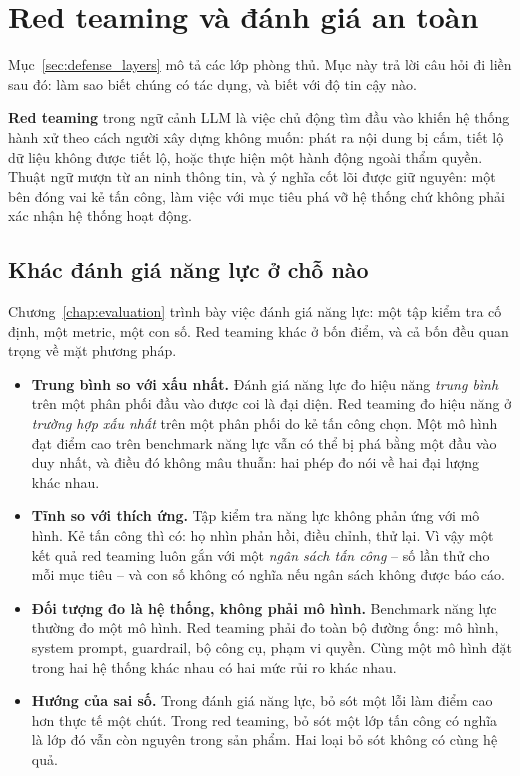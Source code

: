 
\section{Red teaming và đánh giá an toàn}
\label{sec:redteam}

Mục~\ref{sec:defense_layers} mô tả các lớp phòng thủ. Mục này trả lời câu hỏi đi liền sau đó: làm sao biết chúng có tác dụng, và biết với độ tin cậy nào.

\textbf{Red teaming} trong ngữ cảnh LLM là việc chủ động tìm đầu vào khiến hệ thống hành xử theo cách người xây dựng không muốn: phát ra nội dung bị cấm, tiết lộ dữ liệu không được tiết lộ, hoặc thực hiện một hành động ngoài thẩm quyền. Thuật ngữ mượn từ an ninh thông tin, và ý nghĩa cốt lõi được giữ nguyên: một bên đóng vai kẻ tấn công, làm việc với mục tiêu phá vỡ hệ thống chứ không phải xác nhận hệ thống hoạt động.

\subsection{Khác đánh giá năng lực ở chỗ nào}
\label{ssec:redteam_vs_capability}

Chương~\ref{chap:evaluation} trình bày việc đánh giá năng lực: một tập kiểm tra cố định, một metric, một con số. Red teaming khác ở bốn điểm, và cả bốn đều quan trọng về mặt phương pháp.

\begin{itemize}
	\item \textbf{Trung bình so với xấu nhất.} Đánh giá năng lực đo hiệu năng \emph{trung bình} trên một phân phối đầu vào được coi là đại diện. Red teaming đo hiệu năng ở \emph{trường hợp xấu nhất} trên một phân phối do kẻ tấn công chọn. Một mô hình đạt điểm cao trên benchmark năng lực vẫn có thể bị phá bằng một đầu vào duy nhất, và điều đó không mâu thuẫn: hai phép đo nói về hai đại lượng khác nhau.
	\item \textbf{Tĩnh so với thích ứng.} Tập kiểm tra năng lực không phản ứng với mô hình. Kẻ tấn công thì có: họ nhìn phản hồi, điều chỉnh, thử lại. Vì vậy một kết quả red teaming luôn gắn với một \emph{ngân sách tấn công} -- số lần thử cho mỗi mục tiêu -- và con số không có nghĩa nếu ngân sách không được báo cáo.
	\item \textbf{Đối tượng đo là hệ thống, không phải mô hình.} Benchmark năng lực thường đo một mô hình. Red teaming phải đo toàn bộ đường ống: mô hình, system prompt, guardrail, bộ công cụ, phạm vi quyền. Cùng một mô hình đặt trong hai hệ thống khác nhau có hai mức rủi ro khác nhau.
	\item \textbf{Hướng của sai số.} Trong đánh giá năng lực, bỏ sót một lỗi làm điểm cao hơn thực tế một chút. Trong red teaming, bỏ sót một lớp tấn công có nghĩa là lớp đó vẫn còn nguyên trong sản phẩm. Hai loại bỏ sót không có cùng hệ quả.
\end{itemize}


